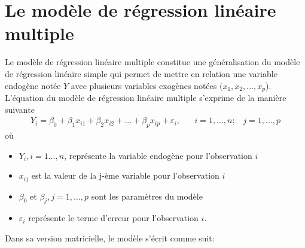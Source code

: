 	

\section{Le modèle de régression linéaire multiple}
\label{sec:ModèleEtNotation}
Le modèle de régression linéaire multiple constitue une généralisation du modèle de régression linéaire simple qui permet de mettre en relation une variable endogène notée $Y$ avec plusieurs variables exogènes notées $(x_1, x_2, ..., x_p$). L'équation du modèle de régression linéaire multiple s'exprime de la manière suivante
\begin{eqnarray}
	Y_i = \beta_0 + \beta_1 x_{i1} +  \beta_2 x_{i2}+ \ldots + \beta_p x_{ip} + \varepsilon_i, \;\;\;\;\;\; i=1,\ldots,n;\;\;\; j=1,\ldots,p
\label{eq:reg_lin_mult}
\end{eqnarray}
\vspace{-0.05in}
où
\begin{itemize}
\item[$\bullet$] $Y_i, i=1\ldots,n$, représente la variable endogène pour l'observation $i$
\item[$\bullet$] $x_{ij}$ est la valeur de la j-ème variable pour l'observation $i$
\item[$\bullet$] $\beta_0$ et $\beta_j, j=1,\dots,p$ sont les paramètres du modèle
\item[$\bullet$] $\varepsilon_i$ représente le terme d'erreur pour l'observation $i$.\\
\end{itemize}

Dans sa version matricielle, le modèle s'écrit comme suit:

